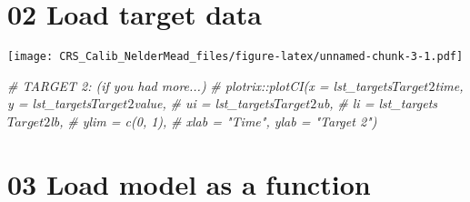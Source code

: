 \documentclass[
]{article}
\newenvironment{Shaded}{\begin{snugshade}}{\end{snugshade}}
\newcommand{\CommentTok}[1]{\textcolor[rgb]{0.56,0.35,0.01}{\textit{#1}}}
\newcommand{\DataTypeTok}[1]{\textcolor[rgb]{0.13,0.29,0.53}{#1}}
\newcommand{\DecValTok}[1]{\textcolor[rgb]{0.00,0.00,0.81}{#1}}
\newcommand{\KeywordTok}[1]{\textcolor[rgb]{0.13,0.29,0.53}{\textbf{#1}}}
\newcommand{\NormalTok}[1]{#1}
\newcommand{\OperatorTok}[1]{\textcolor[rgb]{0.81,0.36,0.00}{\textbf{#1}}}
\newcommand{\StringTok}[1]{\textcolor[rgb]{0.31,0.60,0.02}{#1}}
\begin{document}
\hypertarget{load-target-data}{%
\section{02 Load target data}\label{load-target-data}}

\begin{Shaded}
\end{Shaded}

\texttt{[image: CRS\_Calib\_NelderMead\_files/figure-latex/unnamed-chunk-3-1.pdf]}

\begin{Shaded}
\begin{Highlighting}[]
\CommentTok{# TARGET 2: (if you had more...)}
\CommentTok{# plotrix::plotCI(x = lst_targets$Target2$time, y = lst_targets$Target2$value, }
\CommentTok{#                 ui = lst_targets$Target2$ub,}
\CommentTok{#                 li = lst_targets$Target2$lb,}
\CommentTok{#                 ylim = c(0, 1), }
\CommentTok{#                 xlab = "Time", ylab = "Target 2")}
\end{Highlighting}
\end{Shaded}

\hypertarget{load-model-as-a-function}{%
\section{03 Load model as a function}\label{load-model-as-a-function}}
\end{document}
